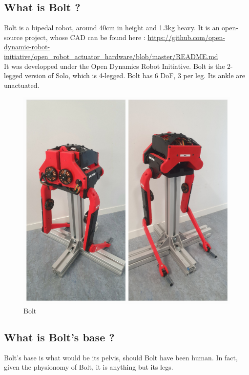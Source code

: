 \documentclass[a4paper,10pt]{article}
\begin{document}
\subsection{What is Bolt ?}
Bolt is a bipedal robot, around 40cm in height and 1.3kg heavy. It is an open-source project, whose CAD can be found here : \url{https://github.com/open-dynamic-robot-initiative/open_robot_actuator_hardware/blob/master/README.md}\\
It was developped under the Open Dynamics Robot Initiative. Bolt is the 2-legged version of Solo, which is 4-legged. Bolt has 6 DoF, 3 per leg. Its ankle are unactuated. 
\begin{figure}[H]
\centering
  \includegraphics[width=\linewidth, angle=0, scale=0.5]{./images/Bolt0.jpg}
  \caption{Bolt}
\end{figure}

\subsection{What is Bolt's base ?}
Bolt's base is what would be its pelvis, should Bolt have been human. In fact, given the physionomy of Bolt, it is anything but its legs.
\end{document}
